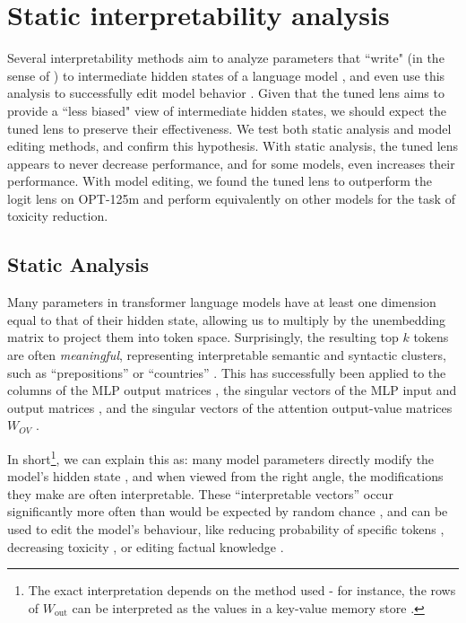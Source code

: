 \documentclass{article}
\theoremstyle{plain}
\theoremstyle{definition}
\begin{document}
\section{Static interpretability analysis}
\label{app:static-analysis}

Several interpretability methods aim to analyze parameters that ``write" (in the sense of \citet{elhage2021mathematical}) to intermediate hidden states of a language model \citep{millidge2022svd, dar2022analyzing, geva2022transformer, geva2020transformer}, and even use this analysis to successfully edit model behavior \citep{geva2022transformer, millidge2022svd, dai-etal-2022-knowledge}. Given that the tuned lens aims to provide a ``less biased" view of intermediate hidden states, we should expect the tuned lens to preserve their effectiveness. We test both static analysis and model editing methods, and confirm this hypothesis. With static analysis, the tuned lens appears to never decrease performance, and for some models, even increases their performance. With model editing, we found the tuned lens to outperform the logit lens on OPT-125m and perform equivalently on other models for the task of toxicity reduction.

\subsection{Static Analysis}

Many parameters in transformer language models have at least one dimension equal to that of their hidden state, allowing us to multiply by the unembedding matrix to project them into token space. Surprisingly, the resulting top $k$ tokens are often \textit{meaningful}, representing interpretable semantic and syntactic clusters, such as ``prepositions'' or ``countries'' \citep{millidge2022svd, dar2022analyzing, geva2022transformer}. This has successfully been applied to the columns of the MLP output matrices \citep{geva2022transformer}, the singular vectors of the MLP input and output matrices \citep{millidge2022svd}, and the singular vectors of the attention output-value matrices $W_{OV}$ \citep{millidge2022svd}.

In short\footnote{The exact interpretation depends on the method used - for instance, the rows of $W_{\text{out}}$ can be interpreted as the values in a key-value memory store \citep{geva2020transformer}.}, we can explain this as: many model parameters directly modify the model's hidden state \citep{elhage2021mathematical}, and when viewed from the right angle, the modifications they make are often interpretable. These ``interpretable vectors'' occur significantly more often than would be expected by random chance \citep{geva2022transformer}, and can be used to edit the model's behaviour, like reducing probability of specific tokens \citep{millidge2022svd}, decreasing toxicity \citep{geva2022transformer}, or editing factual knowledge \citep{dai-etal-2022-knowledge}.
\end{document}
